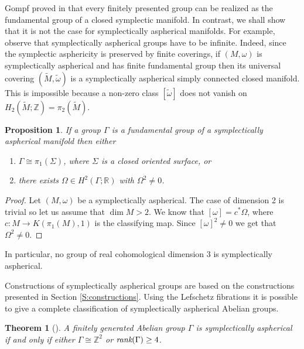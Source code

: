 \documentclass[12pt]{amsart}
\newcommand{\B}[1]{{\mathbb #1}}
\newtheorem{theorem}[subsection]{Theorem}%
\newtheorem{proposition}[subsection]{Proposition}
\numberwithin{equation}{section}
\theoremstyle{definition}
\theoremstyle{remark}
\numberwithin{figure}{section}
\numberwithin{table}{section}
\newcommand{\Om}{{\Omega}}
\newcommand{\om}{{\omega}}
\newcommand{\Ga}{{\Gamma}}
\newcommand{\Si}{{\Sigma}}
\newcommand{\Mo}{(M,\omega )}
\newcommand{\ms}{{\medskip}}
\begin{document}
\ms 
Gompf proved in \cite{G1} that every finitely presented group can be realized as 
the fundamental group of a closed symplectic manifold. 
In contrast, we shall show that it is not the case for 
symplectically aspherical manifolds. For example, observe 
that symplectically aspherical groups have to be infinite. 
Indeed, since the symplectic asphericity is preserved by  
finite coverings, if $\Mo$ is symplectically 
aspherical and has finite fundamental group then 
its universal covering $(\widetilde M,\widetilde \om)$ 
is a symplectically aspherical simply connected closed manifold.  
This is impossible  because a non-zero class $[\widetilde \om]$  
 does not vanish on $H_2(\widetilde M;\B Z)=\pi_2(\widetilde M)$.  
 
\begin{proposition}\label{P:group} 
If a group $\Gamma$ is a fundamental group of a symplectically aspherical 
manifold then either 
 
\begin{enumerate} 
\item 
$\Gamma \cong \pi_1(\Si)$, where $\Si$ is a closed  
oriented surface, or 
\item 
there exists $\Om\in H^2(\Gamma;\B R)$ with $\Om^2\neq 0$. 
\end{enumerate} 
\end{proposition} 
 
\begin{proof} 
Let $\Mo$ be a symplectically aspherical. The case of 
dimension 2 is trivial so let us assume that $\dim M>2$. 
We know that $[\om]=c^*\Om$, where $c:M\to K(\pi_1(M),1)$ 
is the classifying map. Since $[\om]^2\neq 0$ we get that 
$\Om^2\neq 0$. 
\end{proof} 
 
In particular, no group of  real cohomological  
dimension 3 is symplectically aspherical.  
 
Constructions of symplectically aspherical groups are based on the 
constructions presented in Section \ref{S:constructions}. 
Using the Lefschetz fibrations it is possible to give 
a complete classification of symplectically aspherical 
Abelian groups. 
 
\begin{theorem}[{\cite[Theorem 1.2]{KRT}}] 
\label{T:abel} 
A finitely generated Abelian group $\Gamma $ is  
symplectically aspherical if and only if either $\Gamma \cong \mathbb Z^2$ or  
$\text{\em rank}(\Ga)\geq 4$. 
\end{theorem} 
 
\end{document}
